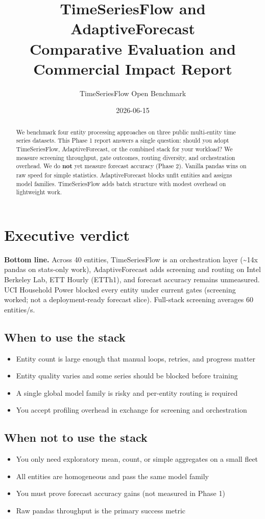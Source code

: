 \documentclass[11pt,a4paper]{article}
\title{\textbf{TimeSeriesFlow and AdaptiveForecast}\\[0.4em]\large Comparative Evaluation and Commercial Impact Report}
\author{TimeSeriesFlow Open Benchmark}
\date{2026-06-15}
\begin{document}
\maketitle

\begin{abstract}
We benchmark four entity processing approaches on three public multi-entity time series datasets.
This Phase 1 report answers a single question: should you adopt TimeSeriesFlow, AdaptiveForecast,
or the combined stack for your workload? We measure screening throughput, gate outcomes, routing
diversity, and orchestration overhead. We do \textbf{not} yet measure forecast accuracy (Phase 2).
Vanilla pandas wins on raw speed for simple statistics. AdaptiveForecast blocks unfit entities and
assigns model families. TimeSeriesFlow adds batch structure with modest overhead on lightweight work.
\end{abstract}


\section{Executive verdict}
\noindent\textbf{Bottom line.} Across 40 entities, TimeSeriesFlow is an orchestration layer (\textasciitilde{}14x pandas on stats-only work), AdaptiveForecast adds screening and routing on Intel Berkeley Lab, ETT Hourly (ETTh1), and forecast accuracy remains unmeasured. UCI Household Power blocked every entity under current gates (screening worked; not a deployment-ready forecast slice). Full-stack screening averages 60 entities/s.

\subsection{When to use the stack}
\begin{itemize}
  \item Entity count is large enough that manual loops, retries, and progress matter
  \item Entity quality varies and some series should be blocked before training
  \item A single global model family is risky and per-entity routing is required
  \item You accept profiling overhead in exchange for screening and orchestration
\end{itemize}

\subsection{When not to use the stack}
\begin{itemize}
  \item You only need exploratory mean, count, or simple aggregates on a small fleet
  \item All entities are homogeneous and pass the same model family
  \item You must prove forecast accuracy gains (not measured in Phase 1)
  \item Raw pandas throughput is the primary success metric
\end{itemize}
\end{document}

